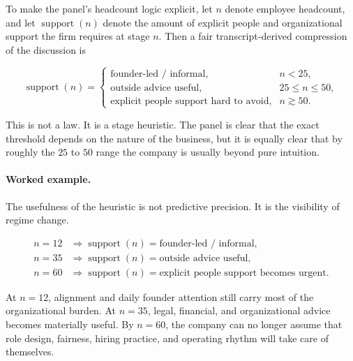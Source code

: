 To make the panel's headcount logic explicit, let \(n\) denote employee headcount, and let \(\operatorname{support}(n)\) denote the amount of explicit people and organizational support the firm requires at stage \(n\). Then a fair transcript-derived compression of the discussion is

\begin{equation}
\operatorname{support}(n)=
\begin{cases}
\text{founder-led / informal}, & n<25,\\
\text{outside advice useful}, & 25\le n\le 50,\\
\text{explicit people support hard to avoid}, & n\gtrsim 50.
\end{cases}
\end{equation}

This is not a law. It is a stage heuristic. The panel is clear that the exact threshold depends on the nature of the business, but it is equally clear that by roughly the \(25\) to \(50\) range the company is usually beyond pure intuition.

\paragraph{Worked example.} The usefulness of the heuristic is not predictive precision. It is the visibility of regime change.

\begin{align}
n=12 &\Rightarrow \operatorname{support}(n)=\text{founder-led / informal},\\
n=35 &\Rightarrow \operatorname{support}(n)=\text{outside advice useful},\\
n=60 &\Rightarrow \operatorname{support}(n)=\text{explicit people support becomes urgent}.
\end{align}

At \(n=12\), alignment and daily founder attention still carry most of the organizational burden. At \(n=35\), legal, financial, and organizational advice becomes materially useful. By \(n=60\), the company can no longer assume that role design, fairness, hiring practice, and operating rhythm will take care of themselves.

